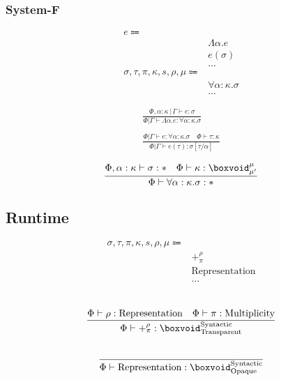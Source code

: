 \documentclass {article}
\begin{document}
\subsubsection{System-F}
\begin{align*}
e \Coloneqq & \\
& \Lambda \alpha. e \tag{Type Lambda} \\
& e (\sigma) \tag{Type Application} \\
& \dots \\
\sigma, \tau, \pi, \kappa, s, \rho, \mu \Coloneqq & \\
& \forall \alpha : \kappa. \sigma \tag{Type Poly}\\ 
& \dots
\end{align*}

\begin{gather*}
\frac
{\Phi, \alpha : \kappa \, | \, \Gamma \vdash e : \sigma}
{\Phi | \Gamma \vdash \Lambda \alpha. e : \forall \alpha : \kappa. \sigma } \\
\\
\frac
{\Phi | \Gamma \vdash e : \forall \alpha : \kappa. \sigma \quad \Phi \vdash \tau : \kappa}
{\Phi | \Gamma \vdash e (\tau) : \sigma [\tau/\alpha] }
\end{gather*}

\begin{gather*}
\frac
{\Phi, \alpha : \kappa \vdash \sigma : * \quad \Phi \vdash \kappa : \boxvoid^\mu_{\mu'}}
{\Phi \vdash \forall \alpha : \kappa. \sigma : * } \\
\end{gather*}

\subsection{Runtime}

\begin{align*}
\sigma, \tau, \pi, \kappa, s, \rho, \mu \Coloneqq & \\
& +^\rho_\pi \tag{Pretype}\\
& \text{Representation} \tag {Representation}\\
& \dots
\end{align*}

\begin{gather*}
\\
\frac
{\Phi \vdash \rho : \text{Representation} \quad \Phi \vdash \pi : \text{Multiplicity}}
{\Phi \vdash +^\rho_\pi : \boxvoid^{\text{Syntactic}}_{\text{Transparent}}} \\
\\
\frac
{}
{\Phi \vdash \text{Representation} : \boxvoid^{\text{Syntactic}}_{\text{Opaque}}}
\end{gather*}
\end{document}
